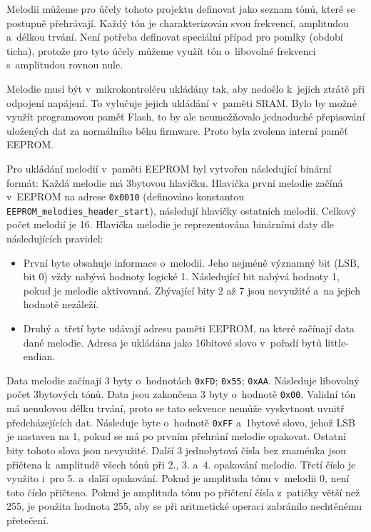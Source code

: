 Melodii můžeme pro účely tohoto projektu definovat jako seznam tónů, které se
postupně přehrávají. Každý tón je charakterizován svou frekvencí, amplitudou
a~délkou trvání. Není potřeba definovat speciální případ pro pomlky (období
ticha), protože pro tyto účely můžeme využít tón o~libovolné frekvenci
s~amplitudou rovnou nule.

Melodie musí být v~mikrokontroléru ukládány tak, aby nedošlo k~jejich ztrátě
při odpojení napájení. To vylučuje jejich ukládání v~paměti SRAM. Bylo by možné
využít programovou paměť Flash, to by ale neumožňovalo jednoduché přepisování
uložených dat za normálního běhu firmware. Proto byla zvolena interní paměť
EEPROM.

Pro ukládání melodií v~paměti EEPROM byl vytvořen následující binární formát:
Každá melodie má 3bytovou hlavičku. Hlavička první melodie začíná v~EEPROM na
adrese \texttt{0x0010} (definováno konstantou
\verb|EEPROM_melodies_header_start|), následují hlavičky ostatních melodií.
Celkový počet melodií je 16. Hlavička melodie je reprezentována binárními daty
dle následujících pravidel:
\begin{itemize}[nosep]
    \item První byte obsahuje informace o~melodii. Jeho nejméně významný bit
        (LSB, bit 0) vždy nabývá hodnoty logické 1. Následující bit nabývá
        hodnoty 1, pokud je melodie aktivovaná. Zbývající bity 2 až 7 jsou
        nevyužité a~na jejich hodnotě nezáleží.
    \item Druhý a~třetí byte udávají adresu paměti EEPROM, na které začínají
        data dané melodie. Adresa je ukládána jako 16bitové slovo v~pořadí bytů
        little-endian.
\end{itemize}

Data melodie začínají 3 byty o~hodnotách \texttt{0xFD}; \texttt{0x55};
\texttt{0xAA}. Následuje libovolný počet 3bytových tónů. Data jsou zakončena 3
byty o~hodnotě \texttt{0x00}. Validní tón má nenulovou délku trvání, proto se
tato sekvence nemůže vyskytnout uvnitř předcházejících dat. Následuje byte
o~hodnotě \texttt{0xFF} a~1bytové slovo, jehož \acs{LSB} je nastaven na 1,
pokud se má po prvním přehrání melodie opakovat. Ostatní bity tohoto slova jsou
nevyužité. Další 3 jednobytová čísla bez znaménka jsou přičtena k~amplitudě
všech tónů při 2., 3. a~4. opakování melodie. Třetí číslo je využito i~pro 5.
a~další opakování. Pokud je amplituda tónu v~melodii 0, není toto číslo
přičteno. Pokud je amplituda tónu po přičtení čísla z~patičky větší než
\num{255}, je použita hodnota \num{255}, aby se při aritmetické operaci
zabránilo nechtěnému přetečení.

